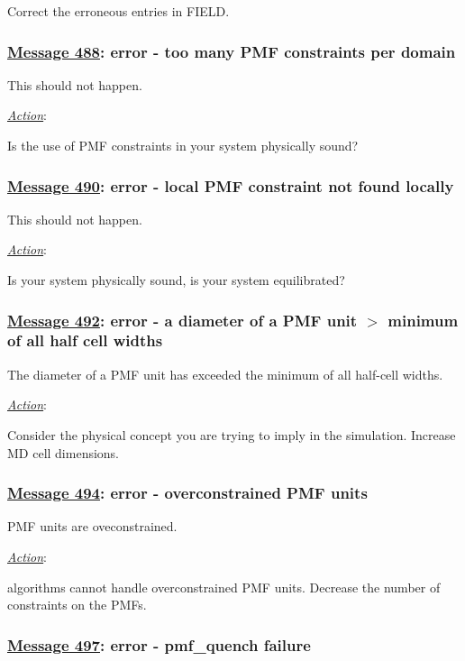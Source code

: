 Correct the erroneous entries in FIELD.

\subsubsection*{\underline{Message 488}: error - too many PMF constraints per domain}

This should not happen.

\noindent \underline{\em Action}:

Is the use of PMF constraints in your system physically sound?

\subsubsection*{\underline{Message 490}: error - local PMF constraint not found locally}

This should not happen.

\noindent \underline{\em Action}:

Is your system physically sound, is your system equilibrated?

\subsubsection*{\underline{Message 492}: error - a diameter of a PMF unit $>$ minimum of all half cell widths}

The diameter of a PMF unit has exceeded the minimum of all half-cell
widths.

\noindent \underline{\em Action}:

Consider the physical concept you are trying to imply in the
simulation.  Increase MD cell dimensions.

\subsubsection*{\underline{Message 494}: error - overconstrained PMF units}

PMF units are oveconstrained.

\noindent \underline{\em Action}:

\D algorithms cannot handle overconstrained PMF units.
Decrease the number of constraints on the PMFs.

\subsubsection*{\underline{Message 497}: error - pmf\_quench failure}


